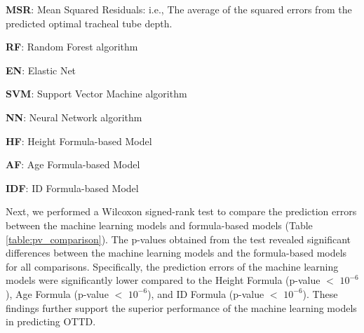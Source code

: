\documentclass[11pt]{article}
\begin{document}
\begin{table}[h]
\caption{Comparison of Mean Squared Residuals between Machine Learning and Formula-based Models}
\label{table:msr_comparison}
\begin{threeparttable}
\renewcommand{\TPTminimum}{\linewidth}
\begin{tablenotes}
\footnotesize
\item \textbf{MSR}: Mean Squared Residuals: i.e., The average of the squared errors from the predicted optimal tracheal tube depth.
\item \textbf{RF}: Random Forest algorithm
\item \textbf{EN}: Elastic Net
\item \textbf{SVM}: Support Vector Machine algorithm
\item \textbf{NN}: Neural Network algorithm
\item \textbf{HF}: Height Formula-based Model
\item \textbf{AF}: Age Formula-based Model
\item \textbf{IDF}: ID Formula-based Model
\end{tablenotes}
\end{threeparttable}
\end{table}


Next, we performed a Wilcoxon signed-rank test to compare the prediction errors between the machine learning models and formula-based models (Table \ref{table:pv_comparison}). The p-values obtained from the test revealed significant differences between the machine learning models and the formula-based models for all comparisons. Specifically, the prediction errors of the machine learning models were significantly lower compared to the Height Formula (p-value $<$ $10^{-6}$), Age Formula (p-value $<$ $10^{-6}$), and ID Formula (p-value $<$ $10^{-6}$). These findings further support the superior performance of the machine learning models in predicting OTTD.
\end{document}
